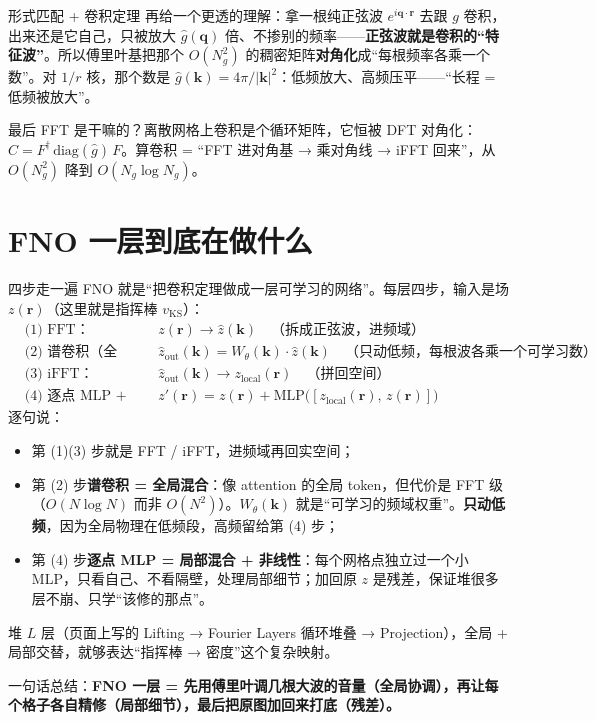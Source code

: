 \documentclass[11pt, a4paper, fontset=none]{ctexart}
\newcommand{\hl}[1]{{\color{key}\bfseries #1}}
\begin{document}
\begin{say}{形式匹配 + 卷积定理}
再给一个更透的理解：拿一根纯正弦波 $e^{i\mathbf q\cdot\mathbf r}$ 去跟 $g$ 卷积，出来还是它自己，只被放大 $\hat g(\mathbf q)$ 倍、不掺别的频率——\hl{正弦波就是卷积的“特征波”}。所以傅里叶基把那个 $O(N_g^2)$ 的稠密矩阵\textbf{对角化}成“每根频率各乘一个数”。对 $1/r$ 核，那个数是 $\hat g(\mathbf k)=4\pi/|\mathbf k|^2$：低频放大、高频压平——“长程 = 低频被放大”。

最后 FFT 是干嘛的？离散网格上卷积是个循环矩阵，它恒被 DFT 对角化：$C = F^\dagger\,\mathrm{diag}(\hat g)\,F$。算卷积 = “FFT 进对角基 → 乘对角线 → iFFT 回来”，从 $O(N_g^2)$ 降到 \hl{$O(N_g\log N_g)$}。
\end{say}

\section{FNO 一层到底在做什么}\label{sec:s6}

\begin{say}{四步走一遍}
FNO 就是“把卷积定理做成一层可学习的网络”。每层四步，输入是场 $z(\mathbf r)$（这里就是指挥棒 $v_{\text{KS}}$）：
\begin{equation}
\begin{aligned}
&\text{(1) FFT：} && z(\mathbf r)\to \hat z(\mathbf k)\quad\text{（拆成正弦波，进频域）}\\
&\text{(2) 谱卷积（全局）：} && \hat z_{\text{out}}(\mathbf k) = W_\theta(\mathbf k)\cdot\hat z(\mathbf k)\quad\text{（只动低频，每根波各乘一个可学习数）}\\
&\text{(3) iFFT：} && \hat z_{\text{out}}(\mathbf k)\to z_{\text{local}}(\mathbf r)\quad\text{（拼回空间）}\\
&\text{(4) 逐点 MLP + 残差（局部）：} && z'(\mathbf r) = z(\mathbf r) + \mathrm{MLP}\big([z_{\text{local}}(\mathbf r),\, z(\mathbf r)]\big)
\end{aligned}
\end{equation}
逐句说：
\begin{itemize}[leftmargin=*]
  \item 第 (1)(3) 步就是 FFT / iFFT，进频域再回实空间；
  \item 第 (2) 步\textbf{谱卷积 = 全局混合}：像 attention 的全局 token，但代价是 FFT 级（$O(N\log N)$ 而非 $O(N^2)$）。$W_\theta(\mathbf k)$ 就是“可学习的频域权重”。\hl{只动低频}，因为全局物理在低频段，高频留给第 (4) 步；
  \item 第 (4) 步\textbf{逐点 MLP = 局部混合 + 非线性}：每个网格点独立过一个小 MLP，只看自己、不看隔壁，处理局部细节；加回原 $z$ 是残差，保证堆很多层不崩、只学“该修的那点”。
\end{itemize}
堆 $L$ 层（页面上写的 Lifting → Fourier Layers 循环堆叠 → Projection），全局 + 局部交替，就够表达“指挥棒 → 密度”这个复杂映射。

一句话总结：\hl{FNO 一层 = 先用傅里叶调几根大波的音量（全局协调），再让每个格子各自精修（局部细节），最后把原图加回来打底（残差）。}
\end{say}
\end{document}
